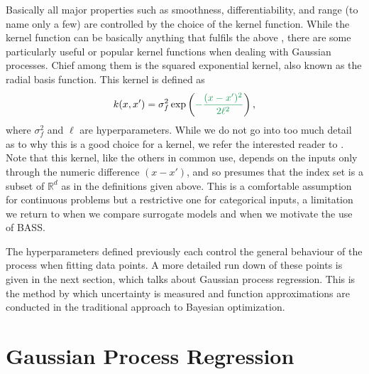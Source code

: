 Basically all major properties such as smoothness, differentiability, and range (to name only a few) are controlled by the choice of the kernel function. While the kernel function can be basically anything that fulfils the above , there are some particularly useful or popular kernel functions when dealing with Gaussian processes. Chief among them is the squared exponential kernel, also known as the radial basis function. This kernel is defined as
\[ k(x, x') = \sigma_f^2 \exp \left( \green{- \frac{(x - x')^2}{2 \ell^2}} \right), \]
where $\sigma_f^2$ and $\ell$ are hyperparameters. While we do not go into too much detail as to why this is a good choice for a kernel, we refer the interested reader to \cite{garnett_bayesoptbook_2023}. Note that this kernel, like the others in common use, depends on the inputs only through the numeric difference $(x - x')$, and so presumes that the index set is a subset of $\mathbb{R}^d$ as in the definitions given above. This is a comfortable assumption for continuous problems but a restrictive one for categorical inputs, a limitation we return to when we compare surrogate models and when we motivate the use of BASS.

The hyperparameters defined previously each control the general behaviour of the process when fitting data points. A more detailed run down of these points is given in the next section, which talks about Gaussian process regression. This is the method by which uncertainty is measured and function approximations are conducted in the traditional approach to Bayesian optimization. 

\section{Gaussian Process Regression}


